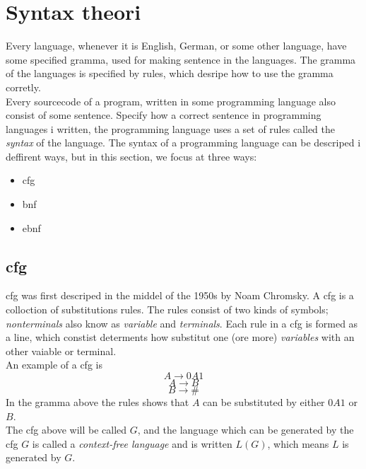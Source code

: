 \section{Syntax theori}
Every language, whenever it is English, German, or some other language, have some specified gramma, used for making sentence in the languages. The gramma of the languages is specified by rules, which desripe how to use the gramma corretly.   \\
Every sourcecode of a program, written in some programming language also consist of some sentence. Specify how a correct sentence in programming languages i written, the programming language uses a set of rules called the \textit{syntax} of the language. The syntax of a programming language can be descriped i deffirent ways, but in this section, we focus at three ways:
\begin{itemize}
\item{\ac{cfg}}
\item{\ac{bnf}}
\item{\ac{ebnf}}
\end{itemize}

\subsection*{\ac{cfg}}
\ac{cfg} was first descriped in the middel of the 1950s by Noam Chromsky. A \ac{cfg} is a colloction of substitutions rules. The rules consist of two kinds of symbols; \textit{nonterminals} also know as \textit{variable} and \textit{terminals}. Each rule in a \ac{cfg} is formed as a line, which constist determents how substitut one (ore more) \textit{variables} with an other vaiable or terminal. \\
An example of a \ac{cfg} is \\
\[A \rightarrow 0A1\]
\[A \rightarrow B\]
\[B \rightarrow \#\]
In the gramma above the rules shows that $A$ can be substituted by either $0A1$ or $B$. \\
The \ac{cfg} above will be called $G$, and the language which can be generated by the \ac{cfg} $G$ is called a \textit{context-free language} and is written $L(G)$, which means $L$ is generated by $G$.

